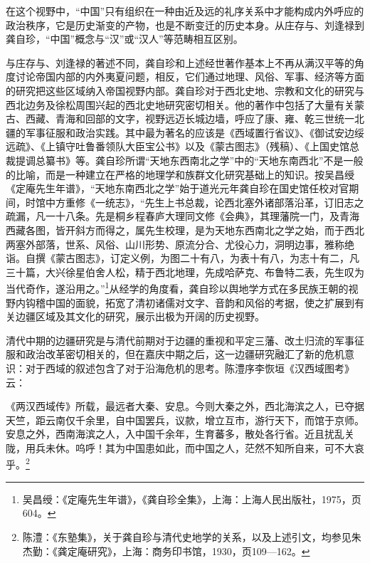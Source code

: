 \documentclass[a4paper, 12pt, openright]{ctexbook}
\renewenvironment{quote}
  {\list{}{\rightmargin2\ccwd \leftmargin2\ccwd \itemindent=2\ccwd \listparindent=2\ccwd}%
   \item\relax\small\kaishu\color{black}}
  {\endlist}
\begin{document}
在这个视野中，“中国”只有组织在一种由近及远的礼序关系中才能构成内外呼应的政治秩序，它是历史渐变的产物，也是不断变迁的历史本身。从庄存与、刘逢禄到龚自珍，“中国”概念与“汉”或“汉人”等范畴相互区别。

与庄存与、刘逢禄的著述不同，龚自珍和上述经世著作基本上不再从满汉平等的角度讨论帝国内部的内外夷夏问题，相反，它们通过地理、风俗、军事、经济等方面的研究把这些区域纳入帝国视野内部。龚自珍对于西北史地、宗教和文化的研究与西北边务及徐松周围兴起的西北史地研究密切相关。他的著作中包括了大量有关蒙古、西藏、青海和回部的文字，视野远迈长城边墙，呼应了康、雍、乾三世统一北疆的军事征服和政治实践。其中最为著名的应该是《西域置行省议》、《御试安边绥远疏》、《上镇守吐鲁番领队大臣宝公书》以及《蒙古图志》（残稿）、《上国史馆总裁提调总纂书》等。龚自珍所谓“天地东西南北之学”中的“天地东南西北”不是一般的比喻，而是一种建立在严格的地理学和族群文化研究基础上的知识。按吴昌绶《定庵先生年谱》，“天地东南西北之学”始于道光元年龚自珍在国史馆任校对官期间，时馆中方重修《一统志》，“先生上书总裁，论西北塞外诸部落沿革，订旧志之疏漏，凡一十八条。先是桐乡程春庐大理同文修《会典》，其理藩院一门，及青海西藏各图，皆开斜方而得之，属先生校理，是为天地东西南北之学之始，而于西北两塞外部落，世系、风俗、山川形势、原流分合、尤役心力，洞明边事，雅称绝诣。自撰《蒙古图志》，订定义例，为图二十有八，为表十有八，为志十有二，凡三十篇，大兴徐星伯舍人松，精于西北地理，先成哈萨克、布鲁特二表，先生叹为当代奇作，遂沿用之。”\footnote{吴昌绶：《定庵先生年谱》，《龚自珍全集》，上海：上海人民出版社，1975，页604。}从经学的角度看，龚自珍以舆地学方式在多民族王朝的视野内钩稽中国的面貌，拓宽了清初诸儒对文字、音韵和风俗的考据，使之扩展到有关边疆区域及其文化的研究，展示出极为开阔的历史视野。

清代中期的边疆研究是与清代前期对于边疆的重视和平定三藩、改土归流的军事征服和政治改革密切相关的，但在嘉庆中期之后，这一边疆研究融汇了新的危机意识：对于西域的叙述包含了对于沿海危机的思考。陈澧序李恢垣《汉西域图考》云：

\begin{quote}
《两汉西域传》所载，最远者大秦、安息。今则大秦之外，西北海滨之人，已夺据天竺，距云南仅千余里，自中国罢兵，议款，增立互市，游行天下，而馆于京师。安息之外，西南海滨之人，入中国千余年，生育蕃多，散处各行省。近且扰乱关陇，用兵未休。呜呼！其为中国患如此，而中国之人，茫然不知所自来，可不大哀乎。\footnote{陈澧：《东塾集》，关于龚自珍与清代史地学的关系，以及上述引文，均参见朱杰勤：《龚定庵研究》，上海：商务印书馆，1930，页109—162。}
\end{quote}
\end{document}
